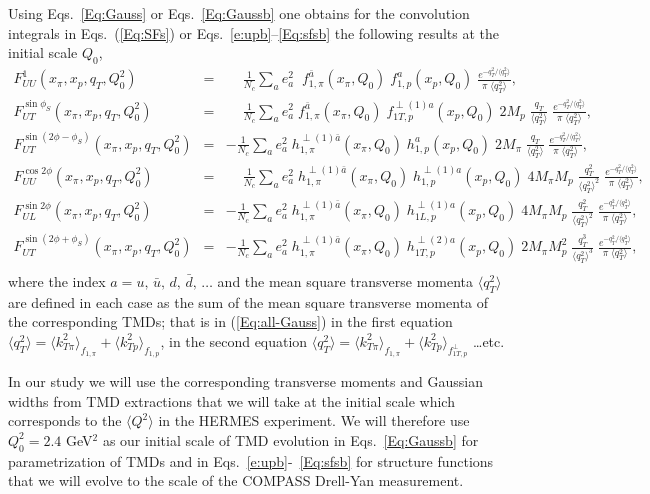 \documentclass[a4paper]{article}
\newcommand{\ba}{\begin{eqnarray}}
\newcommand{\ea}{\end{eqnarray}}
\newcommand{\la}{\langle}
\newcommand{\ra}{\rangle}
\def\avkTpi{\la k_{T \pi}^2 \ra}
\def\avkTN{\la k_{Tp}^2 \ra}
\def\avqT{\la q_T^2 \ra}
\begin{document}
Using Eqs.~\eqref{Eq:Gauss}  or Eqs.~\eqref{Eq:Gaussb} one obtains for the convolution integrals 
in Eqs.~(\ref{Eq:SFs}) or Eqs.~\eqref{e:upb}--\eqref{Eq:sfsb} the following results at the initial scale $Q_0$, 
\ba 
     F_{UU}^1(x_{\pi},x_p,q_T,Q_0^2)
     &=& \phantom{-} \frac{1}{N_c} \sum_a e_a^2 \; 
     \;f_{1,\pi}^{\bar{a}} (x_{\pi},Q_0)\;f_{1,p}^a(x_p,Q_0)
     \;\frac{e^{-q_T^2/\avqT}}{\pi \; \avqT}, \nonumber\\
     F_{UT}^{\sin\phi_S}(x_{\pi},x_p,q_T,Q_0^2)
     &=& \phantom{-} \frac{1}{N_c} \sum_a e_a^2 \; 
     f_{1,\pi}^{\bar{a}} (x_{\pi},Q_0) \; f_{1T,p}^{\perp (1)a}(x_p,Q_0)
     \; 2 M_p \; \frac{q_T }{\avqT} \; 
     \frac{e^{-q_T^2/\avqT}}{\pi \; \avqT}, \nonumber\\
     F_{UT}^{\sin(2\phi-\phi_S)}(x_{\pi},x_p,q_T,Q_0^2)
     &=& -  \frac{1}{N_c} \sum_a e_a^2 \; 
     h_{1,\pi}^{\perp (1) {\bar{a}}} (x_{\pi},Q_0) \; h_{1,p}^a(x_p,Q_0)
     \; 2 M_{\pi} \; \frac{q_T }{\avqT} \;
     \frac{e^{-q_T^2/\avqT}}{\pi \; \avqT}, \nonumber\\
     F_{UU}^{\cos 2\phi}(x_{\pi},x_p,q_T,Q_0^2)
     &=& \phantom{-} \frac{1}{N_c} \sum_a e_a^2 \; 
     h_{1,\pi}^{\perp (1) {\bar{a}}} (x_{\pi},Q_0) \; h_{1,p}^{\perp (1) a}(x_p,Q_0)\;
     4 M_{\pi}M_p \;  \frac{q_T^2 }{\avqT^2} \; 
     \frac{e^{-q_T^2/\avqT}}{\pi \; \avqT},\nonumber\\
     F_{UL}^{\sin 2\phi}(x_{\pi},x_p,q_T,Q_0^2)
     &=& - \frac{1}{N_c}  \sum_a e_a^2 \; 
     h_{1,\pi}^{\perp (1){\bar{a}}} (x_{\pi},Q_0) \; h_{1L,p}^{\perp (1)a}(x_p,Q_0)
     \; 4 M_{\pi}M_p\; \frac{q_T^2 }{\avqT^2} \; 
     \frac{e^{-q_T^2/\avqT}}{\pi \; \avqT}, \nonumber\\
     F_{UT}^{\sin(2\phi+\phi_S)}(x_{\pi},x_p,q_T,Q_0^2)
     &=& -  \frac{1}{N_c} \sum_a e_a^2 \; 
     h_{1,\pi}^{\perp (1){\bar{a}}} (x_{\pi},Q_0) \; h_{1T,p}^{\perp (2) a}(x_p,Q_0)
     \; 2 M_{\pi}M_p^2\;  
     \frac{q_T^3 }{\avqT^3} \; 
     \frac{e^{-q_T^2/\avqT}}{\pi \; \avqT}, \nonumber\\   \label{Eq:all-Gauss} 
\ea
where the index $a=u,\,\bar{u},\,d,\,\bar{d},\,\dots$ 
and the mean square transverse momenta $\avqT$ are defined in each case as 
the sum of the mean square transverse momenta of the corresponding TMDs; that is in  (\ref{Eq:all-Gauss})
in the first equation $\avqT = \avkTpi_{f_{1,\pi}}+\avkTN_{f_{1,p}}$, 
in the second equation $\avqT = \avkTpi_{f_{1,\pi}}+\avkTN_{f^\perp_{1T,p}}$ \dots etc.

In our study we will use the corresponding 
transverse moments and Gaussian widths from TMD extractions
that we will take at the initial scale
which corresponds to the $\la Q^2\ra$ in the HERMES experiment. We will therefore use $Q_0^2 = 2.4$ GeV$^2$ as our initial scale of TMD evolution in Eqs.~\eqref{Eq:Gaussb} for parametrization of TMDs 
and in Eqs.~\eqref{e:upb}-~\eqref{Eq:sfsb} for structure functions 
that we will evolve to the scale of the COMPASS Drell-Yan measurement.
\end{document}
